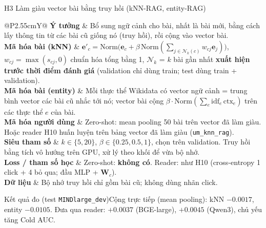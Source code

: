 \documentclass[aspectratio=169,t]{beamer}
\makeatletter
\newcommand{\code}[1]{\texttt{#1}}
\newcommand{\bangmota}[1]{{\scriptsize\renewcommand{\arraystretch}{1.1}\setlength{\tabcolsep}{4pt}%
  \begin{tabularx}{\textwidth}{@{}P{2.55cm}Y@{}}\toprule #1 \bottomrule\end{tabularx}}}
\newcommand{\rw}[2]{\textbf{#1} & #2\\ \midrule}
\newcommand{\rwl}[2]{\textbf{#1} & #2\\}
\newcommand{\ketqua}[1]{\begin{exampleblock}{Kết quả đo (test \code{MINDlarge\_dev})}\scriptsize #1\end{exampleblock}}
\makeatother
\begin{document}
\begin{frame}[shrink]{H3 \textperiodcentered{} Làm giàu vector bài bằng truy hồi (kNN-RAG, entity-RAG)}
\bangmota{
\rw{Ý tưởng}{Bổ sung ngữ cảnh cho bài, nhất là bài mới, bằng cách lấy thông tin từ các bài cũ giống nó (truy hồi), rồi cộng vào vector bài.}
\rw{Mã hóa bài (kNN)}{$\mathbf e'_c=\mathrm{Norm}\!\big(\mathbf e_c+\beta\,\mathrm{Norm}(\sum_{j\in\mathcal N_k(c)}w_{cj}\mathbf e_j)\big)$, $w_{cj}=\max(s_{cj},0)$ chuẩn hóa tổng bằng 1, $\mathcal N_k$ = $k$ bài gần nhất \textbf{xuất hiện trước thời điểm đánh giá} (validation chỉ dùng train; test dùng train + validation).}
\rw{Mã hóa bài (entity)}{Mỗi thực thể Wikidata có vector ngữ cảnh = trung bình vector các bài cũ nhắc tới nó; vector bài cộng $\beta\cdot\mathrm{Norm}(\sum_e \mathrm{idf}_e\,\mathrm{ctx}_e)$ trên các thực thể $e$ của bài.}
\rw{Mã hóa người dùng}{Zero-shot: mean pooling 50 bài trên vector đã làm giàu. Hoặc reader H10 huấn luyện trên bảng vector đã làm giàu (\code{um\_knn\_rag}).}
\rw{Siêu tham số}{$k\in\{5,20\}$, $\beta\in\{0.25,0.5,1\}$, chọn trên validation. Truy hồi bằng tích vô hướng trên GPU, xử lý theo khối để vừa bộ nhớ.}
\rw{Loss / tham số học}{Zero-shot: \textbf{không có}. Reader: như H10 (cross-entropy 1 click + 4 bỏ qua; đầu MLP + $\mathbf W_c$).}
\rwl{Dữ liệu}{Bộ nhớ truy hồi chỉ gồm bài cũ; không dùng nhãn click.}
}
\ketqua{Cộng trực tiếp (mean pooling): kNN $-0.0017$, entity $-0.0105$. Đưa qua reader: $+0.0037$ (BGE-large), $+0.0045$ (Qwen3), chủ yếu tăng Cold AUC.}
\par\kern0pt
\end{frame}
\end{document}

